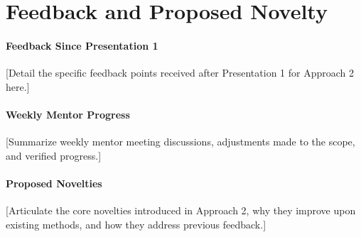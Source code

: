 \section{Feedback and Proposed Novelty}
\label{sec:app2_feedback_novelty}


\paragraph{Feedback Since Presentation 1}
[Detail the specific feedback points received after Presentation 1 for Approach 2 here.]

\paragraph{Weekly Mentor Progress}
[Summarize weekly mentor meeting discussions, adjustments made to the scope, and verified progress.]

\paragraph{Proposed Novelties}
[Articulate the core novelties introduced in Approach 2, why they improve upon existing methods, and how they address previous feedback.]
